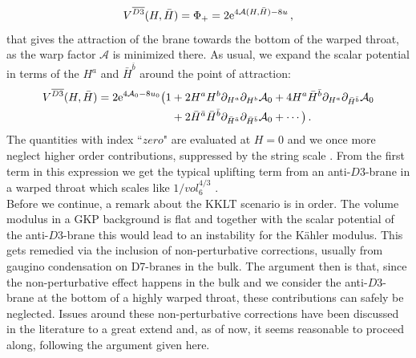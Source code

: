 \documentclass[12pt]{report}
\newcommand{\be}{\begin{equation}}
\newcommand{\ee}{\end{equation}}
\newcommand{\bea}{\begin{equation}\begin{aligned}}
\newcommand{\eea}{\end{aligned}\end{equation}}
\def\rme{{\rm e}}
\begin{document}
\be 
V^{\overline{D3}}(H,\bar{H}) = \Phi_+ = 2 \rme^{4\mathcal{A}(H,\bar{H})-8u}\,,
\label{eq:barD3scalpotorig}
\ee
that gives the attraction of the brane towards the bottom of the warped throat, as the warp factor $\mathcal{A}$ is minimized there. As usual, we expand the scalar potential in terms of the $H^a$ and $\bar{H}^{\bar{b}}$ around the point of attraction:
\bea 
V^{\overline{D3}}(H,\bar{H}) = 2 \rme^{4 \mathcal{A}_0-8u_0} \big( 1 &+ 2 H^a H^b \partial_{H^a} \partial_{H^b} \mathcal{A}_0 + 4 H^a \bar{H}^{\bar{b}} \partial_{H^a} \partial_{\bar{H}^{\bar{b}}} \mathcal{A}_0  \\&+ 2 \bar{H}^{\bar{a}} \bar{H}^{\bar{b}} \partial_{\bar{H}^{\bar{a}}} \partial_{\bar{H}^{\bar{b}}} \mathcal{A}_0 + \cdots \big)\,.
\eea
The quantities with index ``$zero$" are evaluated at $H=0$ and we once more neglect higher order contributions, suppressed by the string scale \cite{McGuirk:2012sb}. From the first term in this expression we get the typical uplifting term from an anti-$D3$-brane in a warped throat which scales like $1/vol_6^{4/3}$ \cite{Kachru:2003sx}.  \\
Before we continue, a remark about the KKLT scenario is in order. The volume modulus in a GKP background is flat and together with the scalar potential of the anti-$D3$-brane this would lead to an instability for the Kähler modulus. This gets remedied via the inclusion of non-perturbative corrections, usually from gaugino condensation on D7-branes in the bulk. The argument then is that, since the non-perturbative effect happens in the bulk and we consider the anti-$D3$-brane at the bottom of a highly warped throat, these contributions can safely be neglected. Issues around these non-perturbative corrections have been discussed in the literature to a great extend \cite{Moritz:2017xto,Moritz:2018sui,Kallosh:2018wme,Moritz:2018ani,Kallosh:2018psh,Gautason:2018gln,Hamada:2018qef,Kallosh:2019axr,Kallosh:2019oxv,Hamada:2019ack,Carta:2019rhx,Gautason:2019jwq,Kachru:2019dvo} and, as of now, it seems reasonable to proceed along, following the argument given here.
\end{document}
